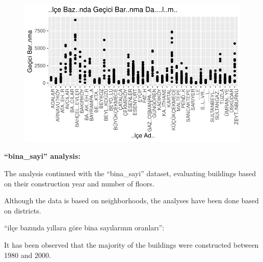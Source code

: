 \documentclass[
  11pt,
  a4paper,
  DIV=11,
  numbers=noendperiod]{scrartcl}
\newenvironment{Shaded}{\begin{snugshade}}{\end{snugshade}}
\newcommand{\AttributeTok}[1]{\textcolor[rgb]{0.40,0.45,0.13}{#1}}
\newcommand{\FunctionTok}[1]{\textcolor[rgb]{0.28,0.35,0.67}{#1}}
\newcommand{\NormalTok}[1]{\textcolor[rgb]{0.00,0.23,0.31}{#1}}
\newcommand{\OtherTok}[1]{\textcolor[rgb]{0.00,0.23,0.31}{#1}}
\newcommand{\SpecialCharTok}[1]{\textcolor[rgb]{0.37,0.37,0.37}{#1}}
\newcommand{\StringTok}[1]{\textcolor[rgb]{0.13,0.47,0.30}{#1}}
\begin{document}
\begin{figure}[H]

{\centering \includegraphics{project_files/figure-pdf/unnamed-chunk-6-1.pdf}

}

\end{figure}

\textbf{``bina\_sayi'' analysis:}

The analysis continued with the ``bina\_sayi'' dataset, evaluating
buildings based on their construction year and number of floors.

Although the data is based on neighborhoods, the analyses have been done
based on districts.

``ilçe bazında yıllara göre bina sayılarının oranları'':

It has been observed that the majority of the buildings were constructed
between 1980 and 2000.

\begin{Shaded}
\end{Shaded}
\end{document}
